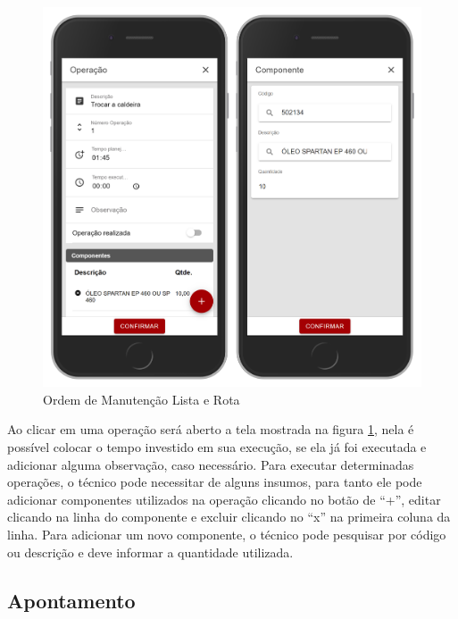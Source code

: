 \begin{figure}[H]
	\caption{\label{mobile-om-operacao}Ordem de Manutenção Lista e Rota}
	\begin{center}
		\includegraphics[scale=0.55]{./Figuras/agil.it/mobile-om-operacao.jpg}
	\end{center}
\end{figure}

Ao clicar em uma operação será aberto a tela mostrada na figura \ref{mobile-om-operacao}, nela é possível colocar o tempo investido em sua execução, se ela já foi executada e adicionar alguma observação, caso necessário.
Para executar determinadas operações, o técnico pode necessitar de alguns insumos, para tanto ele pode adicionar componentes utilizados na operação clicando no botão de ``+'', editar clicando na linha do componente e excluir clicando no ``x'' na primeira coluna da linha.
Para adicionar um novo componente, o técnico pode pesquisar por código ou descrição e deve informar a quantidade utilizada.

\subsection{Apontamento}

